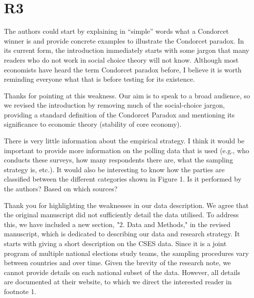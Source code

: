 \documentclass[a4paper, 12pt]{scrartcl}
\theoremstyle{break}
\newenvironment{changes}{\par\color{violet}\par\addvspace{\baselineskip}}{\par\addvspace{\baselineskip}}
\begin{document}
\newpage
\section{R3}

\begin{changes}
	The authors could start by explaining in “simple” words what a Condorcet winner is and provide concrete examples to illustrate the Condorcet paradox. In its current form, the introduction immediately starts with some jargon that many readers who do not work in
	social choice theory will not know. Although most economists have heard the term Condorcet paradox before, I believe it is worth reminding everyone what that is before testing for its existence.
\end{changes}

Thanks for pointing at this weakness. Our aim is to speak to a broad audience, so we revised the introduction by removing much of the social-choice jargon, providing a standard definition of the Condorcet Paradox and mentioning its significance to economic theory (stability of core economy). 

\begin{changes}
	There is very little information about the empirical strategy. I think it would be important to provide more information on the polling data that is used (e.g., who conducts these surveys, how many respondents there are, what the sampling strategy is, etc.). It would also be interesting to know how the parties are classified between the different categories shown in Figure 1. Is it performed by the authors? Based on which sources?
\end{changes}

Thank you for highlighting the weaknesses in our data description. We agree that the original manuscript did not sufficiently detail the data utilised. To address this, we have included a new section, "2. Data and Methods," in the revised manuscript, which is dedicated to describing our data and research strategy. It starts with giving a short description on the CSES data. Since it is a joint program of multiple national elections study teams, the sampling procedures vary between countries and over time. Given the brevity of the research note, we cannot provide details on each national subset of the data. However, all details are documented at their website, to which we direct the interested reader in footnote 1. 
\end{document}
